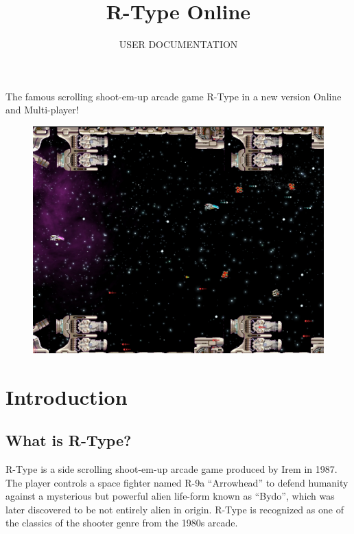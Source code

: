 \documentclass{koala-fr}
\begin{document}
\title{R-Type Online}
\subtitle{USER DOCUMENTATION}

\summary
{
  The famous scrolling shoot-em-up arcade game R-Type in a new version
  Online and Multi-player!
  \begin{figure}[H]
    \begin{center}
      \includegraphics[width=15cm]{game.jpg}
    \end{center}
  \end{figure}
}

\maketitle

\tableofcontents

\chapter{Introduction}

\section{What is R-Type?}

R-Type is a side scrolling shoot-em-up arcade game produced by Irem in 1987. The player controls a space fighter named R-9a ``Arrowhead'' to defend humanity against a mysterious but powerful alien life-form known as ``Bydo'', which was later discovered to be not entirely alien in origin. R-Type is recognized as one of the classics of the shooter genre from the 1980s arcade.
\end{document}
